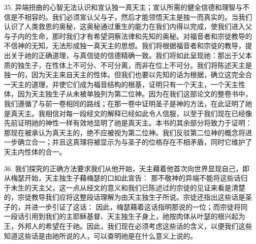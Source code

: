 35. 异端扭曲的心智无法认识和宣认独一真天主；宣认所需的健全信德和理智与不信是不相容的。我们必须宣认父与子，然后才能领悟天主是独一而真实的。当我们认识了人类救恩的奥秘，这奥秘通过重生的能力在我们内得以完成，使我们进入父与子内的生命，那时我们才有希望洞察法律和先知的奥秘。对福音者和宗徒教导的不信神的无知，无法形成独一真天主的思想。我们将根据福音者和宗徒的教导，提出关于祂的正确道理，与真信徒的信德精确一致。我们将如此呈现祂：那出于父本质的独生子，在性体上不可分、不可分离，而非在位上不可分。我们将陈述天主是独一的，因为天主来自天主的性体。但我们也要以先知的话为根据，确立这完全合一天主的道理，并使它们成为福音结构的根基，证明只有一个天主，一个天主性体，因为天主独生子从未被单独列为第二位神。因为在我们这部论文的整卷书中，我们遵循了与前一卷相同的路线；在那一卷中证明圣子是神的方法，在此证明了祂是真天主。我相信对每一段经文的解释已经如此令人信服，以至于我们现在已经像先前证明祂的神性一样有效地显明了祂是真天主。本书的其余部分将致力于证明：那现在被承认为真天主的，绝不应被视为第二位神。我们反驳第二位神的概念将进一步确立合一；并且这真理将被显示为与圣子的位格存在不相矛盾，同时它维护了天主内性体的合一。\par

36. 我们探究的正确方法要求我们从他开始，天主藉着他首次向世界显现自己，即从梅瑟开始，天主独生子藉梅瑟的口如此宣告：  那不敬神的异端不能将这些话归于未生的天主父，这一点从经文的意义和我们已陈述过的宗徒的见证来看是清楚的，宗徒教导我们应将这整段话理解为由天主独生子所说。宗徒还指出这些话是圣子的，并进一步引证了这话： 因此，梅瑟藉着这话指明那说的一位；而宗徒将同一段话引用到我们的主耶稣基督、天主独生子身上，祂按肉体从叶瑟的根兴起为王，外邦人的希望在于祂。因此，我们现在必须考虑这些话的含义，以便我们这些知道这些话是由祂所说的人，可以查明祂是在什么意义上说的。\par

